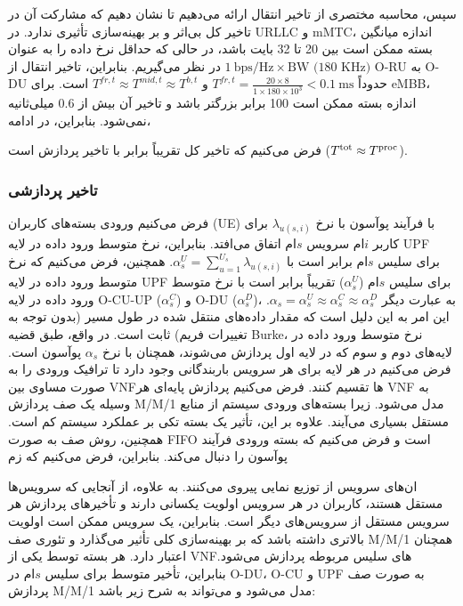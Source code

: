 سپس، محاسبه مختصری از تاخیر انتقال ارائه می‌دهیم تا نشان دهیم که مشارکت آن در تاخیر کل بی‌اثر و بر بهینه‌سازی تأثیری ندارد.
در URLLC و mMTC، اندازه میانگین بسته ممکن است بین 20 تا 32 بایت باشد، در حالی که حداقل نرخ داده را به عنوان $1\ \text{bps/Hz} \times \text{BW (180 KHz)}$ در نظر می‌گیریم. بنابراین، تاخیر انتقال از O-RU به O-DU حدوداً $T^{fr,t} = \frac{20\times 8}{1 \times 180 \times 10^3} < 0.1\ \text{ms}$ و $T^{fr,t} \approx T^{mid,t} \approx T^{b,t}$ است. برای eMBB، اندازه بسته ممکن است 100 برابر بزرگتر باشد و تاخیر آن بیش از 0.6 میلی‌ثانیه نمی‌شود.
بنابراین، در ادامه،

فرض می‌کنیم که تاخیر کل تقریباً برابر با تاخیر پردازش است ($T^{\text{\text{tot}}} \approx T^{\text{proc}}$).


\subsubsection{تاخیر پردازشی}

فرض می‌کنیم ورودی بسته‌های کاربران (UE) با فرآیند پوآسون با نرخ $\lambda_{u(s,i)}$ برای کاربر $i$ام سرویس $s$ام اتفاق می‌افتد. بنابراین، نرخ متوسط ورود داده در لایه UPF برای سلیس $s$ام برابر است با $\alpha_{s}^U = \sum_{u=1}^{U_s}\lambda_{u(s,i)}$.
همچنین، فرض می‌کنیم که نرخ متوسط ورود داده در لایه UPF برای سلیس $s$ام ($\alpha_{s}^U$) تقریباً برابر است با نرخ متوسط ورود داده در لایه O-CU-UP ($\alpha_{s}^C$) و O-DU ($\alpha_{s}^D$)، به عبارت دیگر $\alpha_{s} =\alpha_{s}^U \approx \alpha_{s}^C \approx \alpha_{s}^D$. این امر به این دلیل است که مقدار داده‌های منتقل شده در طول مسیر (بدون توجه به تغییرات فریم) ثابت است.
در واقع، طبق قضیه Burke، نرخ متوسط ورود داده در لایه‌های دوم و سوم که در لایه اول پردازش می‌شوند، همچنان با نرخ $\alpha_{s}$ پوآسون است.
فرض می‌کنیم در هر لایه برای هر سرویس باربندگانی وجود دارد تا ترافیک ورودی را به صورت مساوی بین VNFها تقسیم کنند.
فرض می‌کنیم پردازش پایه‌ای هر VNF به وسیله یک صف پردازش M/M/1 مدل می‌شود.
زیرا بسته‌های ورودی سیستم از منابع مستقل بسیاری می‌آیند. علاوه بر این، تأثیر یک بسته تکی بر عملکرد سیستم کم است. همچنین، روش صف به صورت FIFO است و فرض می‌کنیم که بسته ورودی فرآیند پوآسون را دنبال می‌کند. بنابراین، فرض می‌کنیم که زم

ان‌های سرویس از توزیع نمایی پیروی می‌کنند. به علاوه، از آنجایی که سرویس‌ها مستقل هستند، کاربران در هر سرویس اولویت یکسانی دارند و تأخیرهای پردازش هر سرویس مستقل از سرویس‌های دیگر است. بنابراین، یک سرویس ممکن است اولویت بالاتری داشته باشد که بر بهینه‌سازی کلی تأثیر می‌گذارد و تئوری صف M/M/1 همچنان اعتبار دارد.
هر بسته توسط یکی از VNFهای سلیس مربوطه پردازش می‌شود. بنابراین، تأخیر متوسط برای سلیس $s$ام در O-DU، O-CU و UPF به صورت صف پردازش M/M/1 مدل می‌شود و می‌تواند به شرح زیر باشد:

